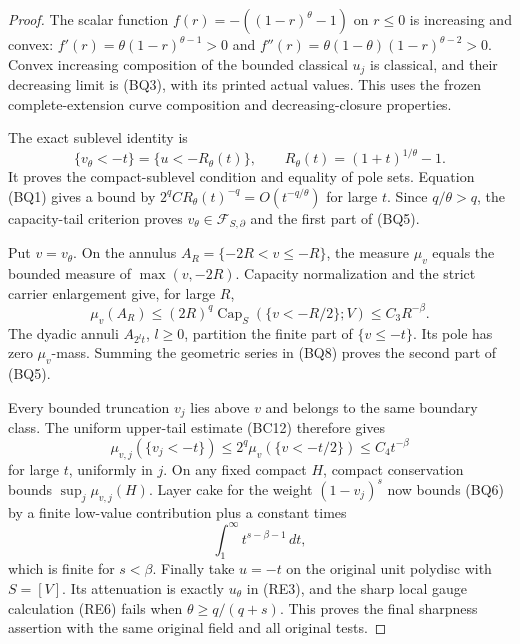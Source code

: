 \documentclass[11pt,a4paper]{article}
\numberwithin{equation}{section}
\theoremstyle{definition}
\theoremstyle{remark}
\begin{document}
\begin{proof}
The scalar function
$f(r)=-((1-r)^\theta-1)$ on $r\leq0$ is increasing and
convex: $f'(r)=\theta(1-r)^{\theta-1}>0$ and
$f''(r)=\theta(1-\theta)(1-r)^{\theta-2}>0$.
Convex increasing composition of the bounded classical $u_j$
is classical, and their decreasing limit is (BQ3), with its
printed actual values. This uses the frozen complete-extension
curve composition and decreasing-closure properties.

The exact sublevel identity is
\[
 \{v_\theta<-t\}
       =\{u<-R_\theta(t)\},\qquad
             R_\theta(t)=(1+t)^{1/\theta}-1.
 \tag{BQ7}
\]
It proves the compact-sublevel condition and equality of pole
sets. Equation (BQ1) gives a bound by
$2^qC R_\theta(t)^{-q}=O(t^{-q/\theta})$ for large $t$.
Since $q/\theta>q$, the capacity-tail criterion proves
$v_\theta\in\mathcal F_{S,\partial}$ and the first part
of (BQ5).

Put $v=v_\theta$. On the annulus
$A_R=\{-2R<v\leq-R\}$, the measure $\mu_v$ equals the
bounded measure of $\max(v,-2R)$. Capacity normalization and
the strict carrier enlargement give, for large $R$,
\[
 \mu_v(A_R)
     \leq(2R)^q\operatorname{Cap}_S(\{v<-R/2\};V)
     \leq C_3 R^{-\beta}.
 \tag{BQ8}
\]
The dyadic annuli $A_{2^lt}$, $l\geq0$, partition the finite
part of $\{v\leq-t\}$. Its pole has zero $\mu_v$-mass.
Summing the geometric series in (BQ8) proves the second part
of (BQ5).

Every bounded truncation $v_j$ lies above $v$ and belongs to
the same boundary class. The uniform upper-tail estimate (BC12)
therefore gives
\[
          \mu_{v,j}(\{v_j<-t\})
                   \leq2^q\mu_v(\{v<-t/2\})
                   \leq C_4t^{-\beta}
 \tag{BQ9}
\]
for large $t$, uniformly in $j$. On any fixed compact $H$,
compact conservation bounds $\sup_j\mu_{v,j}(H)$.
Layer cake for the weight $(1-v_j)^s$ now bounds (BQ6) by
a finite low-value contribution plus a constant times
\[
                        \int_1^\infty t^{s-\beta-1}\,dt,
\]
which is finite for $s<\beta$. Finally take $u=-t$ on the
original unit polydisc with $S=[V]$. Its attenuation is exactly
$u_\theta$ in (RE3), and the sharp local gauge calculation
(RE6) fails when $\theta\geq q/(q+s)$. This proves the final
sharpness assertion with the same original field and all
original tests.
\end{proof}



\end{document}
